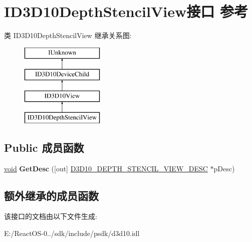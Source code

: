 \hypertarget{interface_i_d3_d10_depth_stencil_view}{}\section{I\+D3\+D10\+Depth\+Stencil\+View接口 参考}
\label{interface_i_d3_d10_depth_stencil_view}
类 I\+D3\+D10\+Depth\+Stencil\+View 继承关系图\+:\begin{figure}[H]
\begin{center}
\leavevmode
\includegraphics[height=4.000000cm]{interface_i_d3_d10_depth_stencil_view}
\end{center}
\end{figure}
\subsection*{Public 成员函数}
\begin{DoxyCompactItemize}
\item 
\mbox{\label{interface_i_d3_d10_depth_stencil_view_a291093cca3c3160e316dd2cf0a752f07}} 
\hyperlink{interfacevoid}{void} {\bfseries Get\+Desc} (\mbox{[}out\mbox{]} \hyperlink{struct_d3_d10___d_e_p_t_h___s_t_e_n_c_i_l___v_i_e_w___d_e_s_c}{D3\+D10\+\_\+\+D\+E\+P\+T\+H\+\_\+\+S\+T\+E\+N\+C\+I\+L\+\_\+\+V\+I\+E\+W\+\_\+\+D\+E\+SC} $\ast$p\+Desc)
\end{DoxyCompactItemize}
\subsection*{额外继承的成员函数}


该接口的文档由以下文件生成\+:\begin{DoxyCompactItemize}
\item 
E\+:/\+React\+O\+S-\/0../sdk/include/psdk/d3d10.\+idl\end{DoxyCompactItemize}
